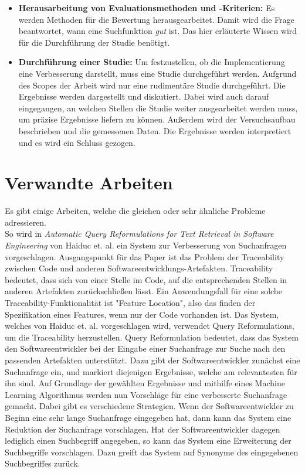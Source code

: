 \begin{itemize}
         Es wird die Weaviate\footnote{https://weaviate.io/} Vektordatenbank verwendet, um Dokumente zu indizieren.
   \item \textbf{Herausarbeitung von Evaluationsmethoden und -Kriterien:}
         Es werden Methoden für die Bewertung herausgearbeitet.
         Damit wird die Frage beantwortet, wann eine Suchfunktion \textit{gut} ist.
         Das hier erläuterte Wissen wird für die Durchführung der Studie benötigt.
   \item \textbf{Durchführung einer Studie:}
         Um festzustellen, ob die Implementierung eine Verbesserung darstellt, muss eine Studie durchgeführt werden.
         Aufgrund des Scopes der Arbeit wird nur eine rudimentäre Studie durchgeführt.
         Die Ergebnisse werden dargestellt und diskutiert.
         Dabei wird auch darauf eingegangen, an welchen Stellen die Studie weiter ausgearbeitet werden muss, um präzise Ergebnisse liefern zu können.
         Außerdem wird der Versuchsaufbau beschrieben und die gemessenen Daten.
         Die Ergebnisse werden interpretiert und es wird ein Schluss gezogen.
\end{itemize}

\section{Verwandte Arbeiten}
Es gibt einige Arbeiten, welche die gleichen oder sehr ähnliche Probleme adressieren.\\

So wird in \textit{Automatic Query Reformulations for Text Retrieval in Software Engineering} von Haiduc et. al. ein System zur Verbesserung von Suchanfragen vorgeschlagen.
Ausgangspunkt für das Paper ist das Problem der Traceability zwischen Code und anderen Softwareentwicklungs-Artefakten.
Traceability bedeutet, dass sich von einer Stelle im Code, auf die entsprechenden Stellen in anderen Artefakten zurückschließen lässt.
Ein Anwendungsfall für eine solche Traceability-Funktionalität ist "Feature Location", also das finden der Spezifikation eines Features, wenn nur der Code vorhanden ist.
Das System, welches von Haiduc et. al. vorgeschlagen wird, verwendet Query Reformulations, um die Traceability herzustellen.
Query Reformulation bedeutet, dass das System den Softwareentwickler bei der Eingabe einer Suchanfrage zur Suche nach den passenden Artefakten unterstützt.
Dazu gibt der Softwareentwickler zunächst eine Suchanfrage ein, und markiert diejenigen Ergebnisse, welche am relevantesten für ihn sind.
Auf Grundlage der gewählten Ergebnisse und mithilfe eines Machine Learning Algorithmus werden nun Vorschläge für eine verbesserte Suchanfrage gemacht.
Dabei gibt es verschiedene Strategien.
Wenn der Softwareentwickler zu Beginn eine sehr lange Suchanfrage eingegeben hat, dann kann das System eine Reduktion der Suchanfrage vorschlagen.
Hat der Softwareentwickler dagegen lediglich einen Suchbegriff angegeben, so kann das System eine Erweiterung der Suchbegriffe vorschlagen.
Dazu greift das System auf Synonyme des eingegebenen Suchbegriffes zurück.\cite{Haiduc_Bavota_Marcus_Oliveto_DeLucia_Menzies_2013}\\

